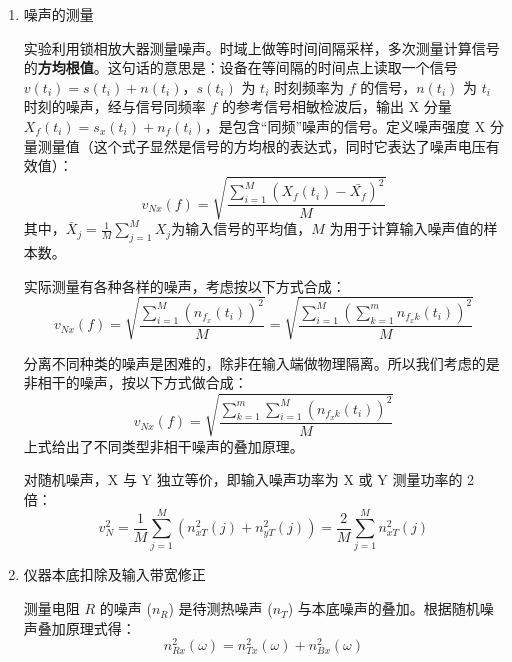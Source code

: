 \begin{enumerate}
\begin{enumerate}
		通过涨落-耗散定理，可以将其与电压的\textbf{功率谱密度}函数$S_V(\omega)$联系起来
		\begin{equation*}
			S_V(\omega) = \frac{S_Q(\omega)}{C^2} \approx \frac{2k_{\rm B}T}{C^2\omega} \text{Im}\left[\chi(\omega)\right] = 2Rk_{\rm B}T \, .
		\end{equation*}
		
		在带宽$\Delta f = \Delta\omega / (2\pi)$内观察到的约翰逊-奈奎斯特电压噪声$\langle V^2 \rangle$，中心频率为$\omega = \pm \omega_0$。因此
		\begin{equation*}
			\langle V^2 \rangle \approx S_V(\omega) \times 2\Delta f \approx 4Rk_{\rm B}T\Delta f \, .
		\end{equation*}
		
	\end{enumerate}
	
	\item 噪声的测量
	
	实验利用锁相放大器测量噪声。时域上做等时间间隔采样，多次测量计算信号的\textbf{方均根值}。这句话的意思是：设备在等间隔的时间点上读取一个信号 $v(t_i) = s(t_i) + n(t_i)$，$s(t_i)$ 为 $t_i$ 时刻频率为 $f$ 的信号，$n(t_i)$ 为 $t_i$ 时刻的噪声，经与信号同频率 $f$ 的参考信号相敏检波后，输出 X 分量$X_f(t_i) = s_x(t_i) + n_f(t_i)$，是包含“同频”噪声的信号。定义噪声强度 X 分量测量值（这个式子显然是信号的方均根的表达式，同时它表达了噪声电压有效值）：
	\[
	v_{Nx}(f) = \sqrt{\frac{\sum_{i=1}^{M} \left(X_f(t_i) - \bar{X_f}\right)^2}{M}}
	\]
	其中，$\bar{X}_j = \frac{1}{M} \sum_{j=1}^{M} X_j$为输入信号的平均值，$M$ 为用于计算输入噪声值的样本数。
	
	实际测量有各种各样的噪声，考虑按以下方式合成：
	\[
	v_{Nx}(f) = \sqrt{\frac{\sum_{i=1}^{M} \left( n_{f_x}(t_i) \right)^2}{M}} = \sqrt{\frac{\sum_{i=1}^{M} \left( \sum_{k=1}^{m} n_{f_xk}(t_i) \right)^2}{M}} 
	\]
	
	分离不同种类的噪声是困难的，除非在输入端做物理隔离。所以我们考虑的是非相干的噪声，按以下方式做合成：
	\[
	v_{Nx}(f) = \sqrt{\frac{\sum_{k=1}^{m} \sum_{i=1}^{M} \left( n_{f_xk}(t_i) \right)^2}{M}}
	\]
	上式给出了不同类型非相干噪声的叠加原理。
	
	对随机噪声，X 与 Y 独立等价，即输入噪声功率为 X 或 Y 测量功率的 2 倍：
	\[
	v_N^2 = \frac{1}{M} \sum_{j=1}^{M} \left( n_{xT}^2(j) + n_{yT}^2(j) \right) = \frac{2}{M} \sum_{j=1}^{M} n_{xT}^2(j)
	\]
	
	\item 仪器本底扣除及输入带宽修正
	
	测量电阻 $R$ 的噪声 ($n_R$) 是待测热噪声 ($n_T$) 与本底噪声的叠加。根据随机噪声叠加原理式得：
	\[
	n_{Rx}^2(\omega) = n_{Tx}^2(\omega) + n_{Bx}^2(\omega)
	\]
	

\end{enumerate}
